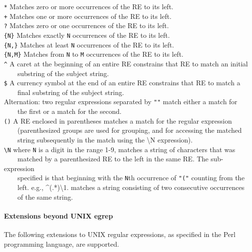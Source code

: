 \texttt{*} Matches zero or more occurrences of the RE to its
left.\\
\texttt{+} Matches one or more occurrences of the RE to its
left.\\
\texttt{?} Matches zero or one occurrences of the RE to its
left.\\
\texttt{\{N\}} Matches exactly \texttt{N} occurrences of the RE to its
left.\\
\texttt{\{N,\}} Matches at least \texttt{N} occurrences of the RE to its
left.\\
\texttt{\{N,M\}} Matches from \texttt{N} to
\texttt{M} occurrences of the RE to its left.\\
\texttt{\^{}} A caret at the beginning of an entire RE constrains that
RE to match an initial\\
 \ \ \ \ substring of the subject string.\\
\texttt{\$} A currency symbol at the end of an entire RE constrains that
RE to match a\\
 \ \ \ \ final substring of the subject string.\\
\texttt{{\textbar}} Alternation: two regular expressions separated by
\texttt{"{\textbar}"} match either a match
for\\
 \ \ \ \ the first or a match for the second.\\
\texttt{()} A RE enclosed in parentheses matches a match for the regular
expression\\
 \ \ \ \ (parenthesized groups are used for grouping, and for accessing
the matched\\
 \ \ \ \ string subsequently in the match using the {\textbackslash}N
expression).\\
\texttt{{\textbackslash}N} where \texttt{N} is a digit in the range 1-9,
matches a string of characters that was\\
 \ \ \ \ matched by a parenthesized RE to the left in the same RE. The
sub-expression\\
 \ \ \ \ specified is that beginning with the \texttt{N}th occurrence of
\texttt{"("} counting from the
\\
 \ \ \ \ left. e.g., \^{}(.*){\textbackslash}1. matches a string consisting of
two consecutive occurrences\\
 \ \ \ \ of the same string.

\paragraph{Extensions beyond UNIX egrep}
The following extensions to UNIX regular expressions, as specified in
the Perl programming language, are supported.

